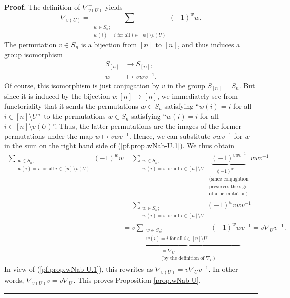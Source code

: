 \documentclass[numbers=enddot,12pt,final,onecolumn,notitlepage]{scrartcl}%
\numberwithin{exer}{subsection}
\theoremstyle{definition}
\newenvironment{proof}[1][Proof]{\noindent\textbf{#1.} }{\ \rule{0.5em}{0.5em}}
\let\sumnonlimits\sum
\renewcommand{\sum}{\sumnonlimits\limits}
\begin{document}
\begin{proof}
The definition of $\nabla_{v\left(  U\right)  }^{-}$ yields%
\begin{equation}
\nabla_{v\left(  U\right)  }^{-}=\sum_{\substack{w\in S_{n};\\w\left(
i\right)  =i\text{ for all }i\in\left[  n\right]  \setminus v\left(  U\right)
}}\left(  -1\right)  ^{w}w. \label{pf.prop.wNab-U.1}%
\end{equation}
The permutation $v\in S_{n}$ is a bijection from $\left[  n\right]  $ to
$\left[  n\right]  $, and thus induces a group isomorphism%
\begin{align*}
S_{\left[  n\right]  }  &  \rightarrow S_{\left[  n\right]  },\\
w  &  \mapsto vwv^{-1}.
\end{align*}
Of course, this isomorphism is just conjugation by $v$ in the group
$S_{\left[  n\right]  }=S_{n}$. But since it is induced by the bijection
$v:\left[  n\right]  \rightarrow\left[  n\right]  $, we immediately see from
functoriality that it sends the permutations $w\in S_{n}$ satisfying
\textquotedblleft$w\left(  i\right)  =i$ for all $i\in\left[  n\right]
\setminus U$\textquotedblright\ to the permutations $w\in S_{n}$ satisfying
\textquotedblleft$w\left(  i\right)  =i$ for all $i\in\left[  n\right]
\setminus v\left(  U\right)  $\textquotedblright. Thus, the latter
permutations are the images of the former permutations under the map $w\mapsto
vwv^{-1}$. Hence, we can substitute $vwv^{-1}$ for $w$ in the sum on the right
hand side of (\ref{pf.prop.wNab-U.1}). We thus obtain
\begin{align*}
\sum_{\substack{w\in S_{n};\\w\left(  i\right)  =i\text{ for all }i\in\left[
n\right]  \setminus v\left(  U\right)  }}\left(  -1\right)  ^{w}w  &
=\sum_{\substack{w\in S_{n};\\w\left(  i\right)  =i\text{ for all }i\in\left[
n\right]  \setminus U}}\underbrace{\left(  -1\right)  ^{vwv^{-1}}%
}_{\substack{=\left(  -1\right)  ^{w}\\\text{(since conjugation}%
\\\text{preserves the sign}\\\text{of a permutation)}}}vwv^{-1}\\
&  =\sum_{\substack{w\in S_{n};\\w\left(  i\right)  =i\text{ for all }%
i\in\left[  n\right]  \setminus U}}\left(  -1\right)  ^{w}vwv^{-1}\\
&  =v\underbrace{\sum_{\substack{w\in S_{n};\\w\left(  i\right)  =i\text{ for
all }i\in\left[  n\right]  \setminus U}}\left(  -1\right)  ^{w}w}%
_{\substack{=\nabla_{U}^{-}\\\text{(by the definition of }\nabla_{U}%
^{-}\text{)}}}v^{-1}=v\nabla_{U}^{-}v^{-1}.
\end{align*}
In view of (\ref{pf.prop.wNab-U.1}), this rewrites as $\nabla_{v\left(
U\right)  }^{-}=v\nabla_{U}^{-}v^{-1}$. In other words, $\nabla_{v\left(
U\right)  }^{-}v=v\nabla_{U}^{-}$. This proves Proposition \ref{prop.wNab-U}.
\end{proof}
\end{document}
